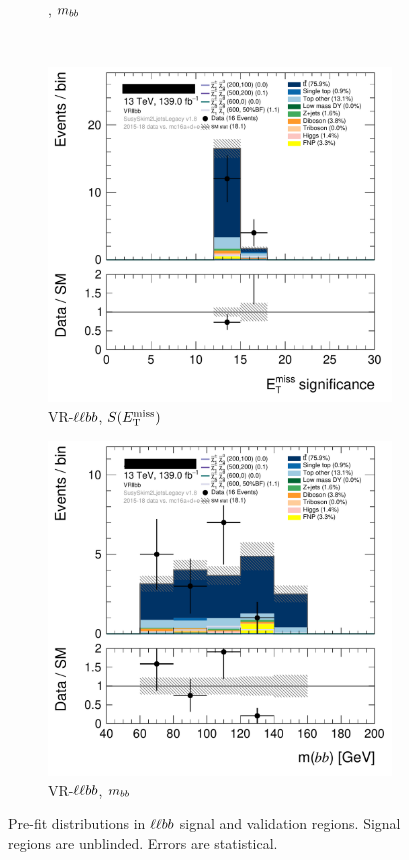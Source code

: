 \begin{figure}[tp]
\begin{subfigure}{0.495\textwidth}
\caption{\srllbb, $m_{bb}$}
\end{subfigure}
\\[0.5em]
\begin{subfigure}{0.495\textwidth}
\centering
\includegraphics[width=\textwidth]{figures/2ljets_def_met_Sign_VRllbb.png}
\caption{VR-$\llbb$, $S(E_\mathrm{T}^\mathrm{miss})$}
\end{subfigure}
\hfill
\begin{subfigure}{0.495\textwidth}
\centering
\includegraphics[width=\textwidth]{figures/2ljets_def_mbb_VRllbb.png}
\caption{VR-$\llbb$, $m_{bb}$}
\end{subfigure}
\caption[
Pre-fit distributions in $\llbb$ signal and validation regions
]{%
Pre-fit distributions in $\llbb$ signal and validation regions.
Signal regions are unblinded.
Errors are statistical.
}
\label{fig:2ljets_high_llbb_region}
\end{figure}

